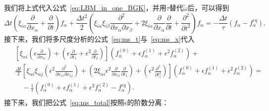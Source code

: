 我们将上式代入公式~\ref{eq:LBM_in_one_BGK}，并用$\tau$替代$\tilde{\omega}$后，可以得到
\begin{equation}
\Delta t\left(\xi_{i \alpha} \frac{\partial}{\partial x_{\alpha}}+\frac{\partial}{\partial t}\right) f_{\alpha}+\frac{\Delta t^{2}}{2}\left(\xi_{i \alpha} \xi_{i \beta} \frac{\partial^{2}}{\partial x_{\alpha} \partial x_{\beta}}+2 \xi_{i \alpha} \frac{\partial}{\partial x_{\alpha}} \frac{\partial}{\partial t}+\frac{\partial^{2}}{\partial t^{2}}\right) f_{\alpha}=-\frac{\Delta t}{\tau}\left(f_{\alpha}-f_{\alpha}^{e q}\right) .
\end{equation}
接下来，我们将多尺度分析的公式~\ref{eq:ms_t}与~\ref{eq:ms_x}代入
\begin{align}
    \begin{split}
& {\left[\xi_{\alpha i}\left(\epsilon \frac{\partial}{\partial x_{1 i}}\right)+\left(\epsilon \frac{\partial}{\partial t_{1}}+\epsilon^{2} \frac{\partial}{\partial t_{2}}\right)\right]\left(f_{\alpha}^{(0)}+\epsilon f_{\alpha}^{(1)}+\epsilon^{2} f_{\alpha}^{(2)}\right)+} \\
& \frac{\Delta t}{2}\left[\xi_{\alpha i} \xi_{\alpha j}\left(\epsilon^{2} \frac{\partial^{2}}{\partial x_{1 i} \partial x_{1 j}}\right)+\left(2 \xi_{\alpha i} \epsilon^{2} \frac{\partial}{\partial x_{1 i}} \frac{\partial}{\partial t_{1}}\right)+\left(\epsilon^{2} \frac{\partial^{2}}{\partial t_{1}^{2}}\right)\right]\left(f_{\alpha}^{(0)}+\epsilon f_{\alpha}^{(1)}+\epsilon^{2} f_{\alpha}^{(2)}\right)= \\
& \quad-\frac{1}{\tau}\left(f_{\alpha}^{(0)}+\epsilon f_{\alpha}^{(1)}+\epsilon^{2} f_{\alpha}^{(2)}-f_{\alpha}^{e q}\right) .
    \end{split}
    \label{eq:ms_total}
\end{align}
接下来，我们把公式~\ref{eq:ms_total}按照$\epsilon$的阶数分离：

